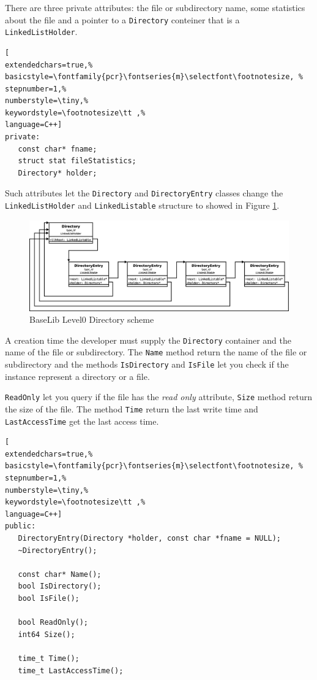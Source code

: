 There are three private attributes: the file or subdirectory name, some statistics about the file and a pointer to a \texttt{Directory} conteiner that is a \texttt{LinkedListHolder}.

\begin{lstlisting}[
extendedchars=true,%
basicstyle=\fontfamily{pcr}\fontseries{m}\selectfont\footnotesize, %
stepnumber=1,%
numberstyle=\tiny,%
keywordstyle=\footnotesize\tt ,%
language=C++]
private:
   const char* fname;
   struct stat fileStatistics;
   Directory* holder;
\end{lstlisting}

Such attributes let the \texttt{Directory} and \texttt{DirectoryEntry} classes change the \texttt{LinkedListHolder} and \texttt{LinkedListable} structure to showed in Figure \ref{f:level0:directory}.

\begin{figure}[h!]
 \begin{center}
  \includegraphics[width=\textwidth]{level0/directory.eps}
  \caption{BaseLib Level0 Directory scheme}
  \label{f:level0:directory}
 \end{center}
\end{figure}

A creation time the developer must supply the \texttt{Directory} container and the name of the file or subdirectory.
The \texttt{Name} method return the name of the file or subdirectory and the methods \texttt{IsDirectory} and \texttt{IsFile} let you check if the instance represent a directory or a file.


\texttt{ReadOnly} let you query if the file has the \textit{read only} attribute, \texttt{Size} method return the size of the file. The method \texttt{Time} return the last write time and \texttt{LastAccessTime} get the last access time.

\begin{lstlisting}[
extendedchars=true,%
basicstyle=\fontfamily{pcr}\fontseries{m}\selectfont\footnotesize, %
stepnumber=1,%
numberstyle=\tiny,%
keywordstyle=\footnotesize\tt ,%
language=C++]
public:
   DirectoryEntry(Directory *holder, const char *fname = NULL);
   ~DirectoryEntry();

   const char* Name();
   bool IsDirectory();
   bool IsFile();

   bool ReadOnly();
   int64 Size();

   time_t Time();
   time_t LastAccessTime();
\end{lstlisting}



